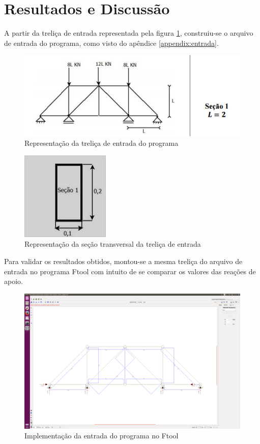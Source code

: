 \documentclass[paper=a4, fontsize=11pt]{scrartcl}
\begin{document}
\section{Resultados e Discussão}

A partir da treliça de entrada representada pela figura \ref{fig:trelica_entrada}, construiu-se o arquivo de entrada do programa, como visto do apêndice \ref{appendix:entrada}.

\begin{figure}[H]
	\includegraphics[width=\textwidth]{trelica_entrada.png}
	\caption{Representação da treliça de entrada do programa}
	\label{fig:trelica_entrada}
\end{figure}

\begin{figure}[H]
	\includegraphics[center]{secao1.png}
	\caption{Representação da seção transversal da treliça de entrada}
	\label{fig:secao14}
\end{figure}


Para validar os resultados obtidos, montou-se a mesma treliça do arquivo de entrada no programa Ftool com intuito de se comparar os valores das reações de apoio.

\begin{figure}[H]
	\includegraphics[width=\textwidth]{ftool.png}
	\caption{Implementação da entrada do programa no Ftool}
	\label{fig:ftool}
\end{figure}
\end{document}
